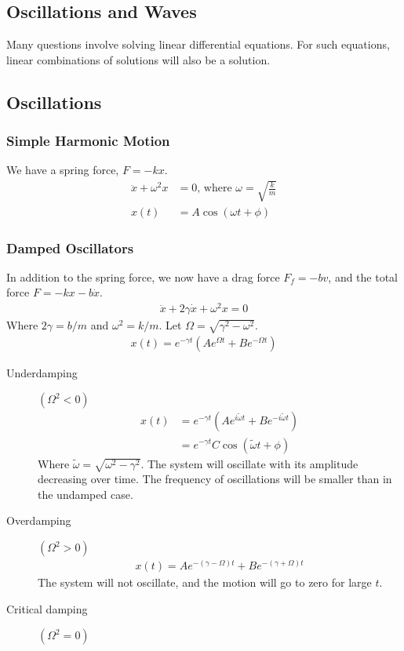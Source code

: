 \documentclass[11pt]{article}
\begin{document}
\begin{multicols*}{3}
\section{Oscillations and Waves}
Many questions involve solving linear differential equations. For such equations, linear combinations of solutions will also be a solution.
\subsection{Oscillations}
\subsubsection{Simple Harmonic Motion}
We have a spring force, $F=-kx$.
	\begin{align*}
	\ddot{x}+\omega^2x&=0 \text{, where }\omega=\sqrt{\frac{k}{m}}\\
	x(t)&=A \cos(\omega t+\phi)
	\end{align*}
\subsubsection{Damped Oscillators}
In addition to the spring force, we now have a drag force $F_f=-bv$, and the total force $F=-kx-b\dot{x}$.
	\begin{align*}
	\ddot{x} + 2\gamma\dot{x}+\omega^2x=0
	\end{align*}
Where $2\gamma=b/m$ and $\omega^2=k/m$. Let $\Omega = \sqrt{\gamma^2-\omega^2}$.
	\begin{align*}
	x(t)=e^{-\gamma t}(Ae^{\Omega t}+Be^{-\Omega t})
	\end{align*}
\begin{description}
\item [Underdamping] $(\Omega^2<0)$
	\begin{align*}
	x(t)&=e^{-\gamma t}(Ae^{i\tilde{\omega}t}+Be^{-i\tilde{\omega}t})\\
	&=e^{-\gamma t}C\cos(\tilde{\omega}t + \phi)
	\end{align*}
Where $\tilde{\omega}=\sqrt{\omega^2-\gamma^2}$. The system will oscillate with its amplitude decreasing over time. The frequency of oscillations will be smaller than in the undamped case.
\item[Overdamping] $(\Omega^2>0)$
	\begin{align*}
	x(t)=Ae^{-(\gamma-\Omega)t}+Be^{-(\gamma+\Omega)t}
	\end{align*}
The system will not oscillate, and the motion will go to zero for large $t$.
\item[Critical damping] $(\Omega^2=0)$


\end{description}
\end{multicols*}
\end{document}
